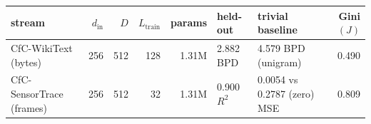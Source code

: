{\footnotesize\setlength{\tabcolsep}{4pt}
\begin{tabular}{lrrrrllr}
\toprule
stream & $d_{\text{in}}$ & $D$ & $L_{\text{train}}$ & params & held-out & trivial baseline & Gini$(J)$ \\
\midrule
CfC-WikiText (bytes) & 256 & 512 & 128 & 1.31M & 2.882 BPD & 4.579 BPD (unigram) & 0.490 \\
CfC-SensorTrace (frames) & 256 & 512 & 32 & 1.31M & 0.900 $R^2$ & 0.0054 vs 0.2787 (zero) MSE & 0.809 \\
\bottomrule
\end{tabular}}
